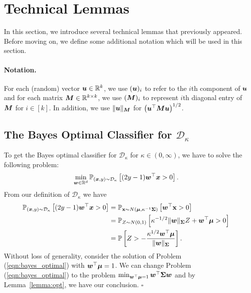 \section{Technical Lemmas}\label{proof:lemmas}
In this section, we introduce several technical lemmas that previously appeared. Before moving on, we define some additional notation which will be used in this section. 
\paragraph{Notation.}
For each (random) vector ${\bm{u}} \in \mathbb{R}^k$, we use $({\bm{u}})_i$ to refer to the $i$th component of ${\bm{u}}$ and for each matrix ${\bm{M}} \in \mathbb{R}^{k \times k}$, we use $({\bm{M}})_i$ to represent $i$th diagonal entry of ${\bm{M}}$ for $i \in [k]$. In addition, we use $\lVert {\bm{u}} \rVert_{\bm{M}}$ for $\left({\bm{u}}^\top{\bm{M}} {\bm{u}}\right)^{1/2}$.
\subsection{The Bayes Optimal Classifier for $\mathcal{D}_\kappa$}\label{proof:Bayes_optimal}
To get the Bayes optimal classifier for $\mathcal{D}_\kappa$ for $\kappa \in (0,\infty)$, we have to solve the following problem:
\begin{equation}\label{eqn:bayes_optimal}
    \min_{{\bm{w}} \in \mathbb{R}^d}  \mathbb{P}_{({\bm{x}},y) \sim \mathcal{D}_\kappa }\left[(2y-1){\bm{w}}^\top {\bm{x}} >0 \right].  
\end{equation}
From our definition of $\mathcal{D}_\kappa$ we have
\begin{align*}
\mathbb{P}_{({\bm{x}},y) \sim \mathcal{D}_\kappa }\left[(2y-1){\bm{w}}^\top {\bm{x}} >0 \right] &= \mathbb{P}_{{\mathbf{x}} \sim N({\bm{\mu}}, \kappa^{-1} {\bm{\Sigma}}) }\left[{\bm{w}}^\top {\mathbf{x}}>0 \right]\\
&= \mathbb{P}_{Z \sim N(0,1)} \left[\kappa^{-1/2}\lVert {\bm{w}} \rVert
_{\bm{\Sigma}} Z + {\bm{w}}^\top {\bm{\mu}} >0 \right]\\
&= \mathbb{P} \left[ Z >  - \frac{\kappa^{1/2} {\bm{w}}^\top {\bm{\mu}} }{\lVert {\bm{w}} \rVert_{\bm{\Sigma}}}\right].
\end{align*}
Without loss of generality, consider the solution of Problem (\ref{eqn:bayes_optimal}) with ${\bm{w}}^\top {\bm{\mu}} = 1$. We can change Problem (\ref{eqn:bayes_optimal}) to the problem $\min_{{\bm{w}}^\top {\bm{\mu}} = 1} {\bm{w}}^\top {\bm{\Sigma}} {\bm{w}}$ and by Lemma~\ref{lemma:opt}, we have our conclusion. \hfill $\square$

